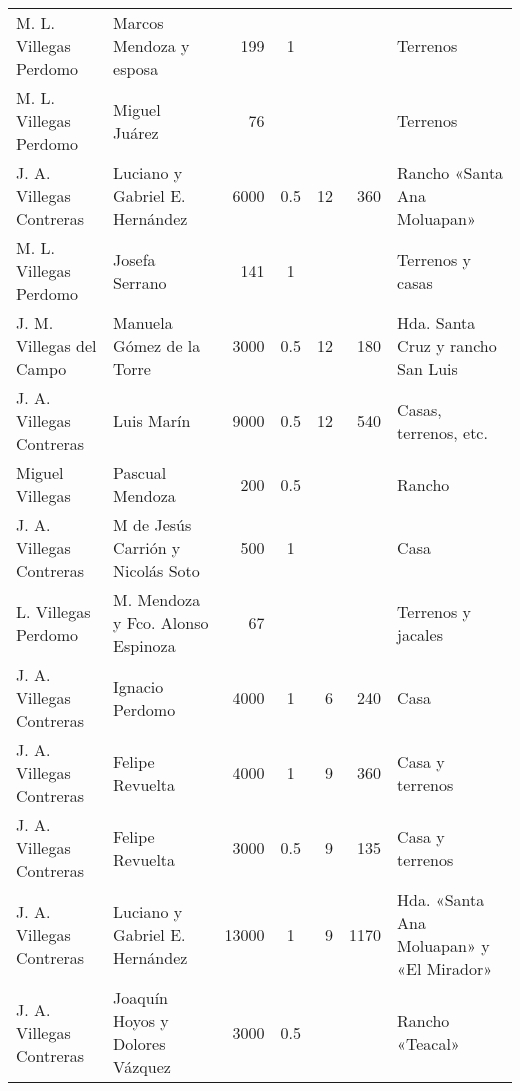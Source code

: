 \documentclass[14pt,twoside,final]{extbook} %
\begin{document}
{\begin{longtable}[c]{@{}p{2.5cm}lrSrrl@{}}
M. L. Villegas Perdomo & Marcos Mendoza y esposa & 199 & 1 & {} & {} & Terrenos \\
M. L. Villegas Perdomo & Miguel Juárez & 76 & {} & {} & {} & Terrenos \\
J. A. Villegas Contreras & Luciano y Gabriel E. Hernández & 6000 & 0.5 & 12 & 360 & Rancho «Santa Ana Moluapan» \\
M. L. Villegas Perdomo & Josefa Serrano & 141 & 1 & {} & {} & Terrenos y casas \\
J. M. Villegas del Campo & Manuela Gómez de la Torre & 3000 & 0.5 & 12 & 180 & Hda. Santa Cruz y rancho San Luis \\
J. A. Villegas Contreras & Luis Marín & 9000 & 0.5 & 12 & 540 & Casas, terrenos, etc. \\
Miguel Villegas & Pascual Mendoza & 200 & 0.5 & {} & {} & Rancho \\
J. A. Villegas Contreras & M de Jesús Carrión y Nicolás Soto & 500 & 1 & {} & {} & Casa \\
L. Villegas Perdomo & M. Mendoza y Fco. Alonso Espinoza & 67 & {} & {} & {} & Terrenos y jacales \\
J. A. Villegas Contreras & Ignacio Perdomo & 4000 & 1 & 6 & 240 & Casa \\
J. A. Villegas Contreras & Felipe Revuelta & 4000 & 1 & 9 & 360 & Casa y terrenos \\
J. A. Villegas Contreras & Felipe Revuelta & 3000 & 0.5 & 9 & 135 & Casa y terrenos \\
J. A. Villegas Contreras & Luciano y Gabriel E. Hernández & 13000 & 1 & 9 & 1170 & Hda. «Santa Ana Moluapan» y «El Mirador» \\
J. A. Villegas Contreras & Joaquín Hoyos y Dolores Vázquez & 3000 & 0.5 & {} & {} & Rancho «Teacal» \\

\end{longtable}}
\end{document}
